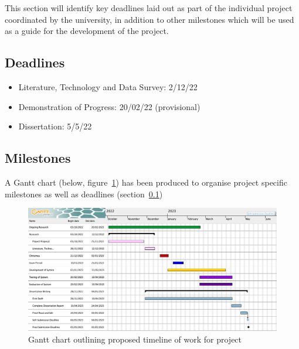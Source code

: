 This section will identify key deadlines laid out as part of the individual project coordinated by the university,
in addition to other milestones which will be used as a guide for the development of the project.

\subsection{Deadlines}\label{subsec:deadlines}
\begin{itemize}
	\item Literature, Technology and Data Survey: 2/12/22
	\item Demonstration of Progress: 20/02/22 (provisional)
	\item Dissertation: 5/5/22
\end{itemize}

\subsection{Milestones}\label{subsec:milestones}
A Gantt chart (below, figure~\ref{fig:gantt}) has been produced to organise project specific milestones as well as deadlines (section~\ref{subsec:deadlines})
\begin{figure}[h]
	\centering
	\includegraphics[width=\columnwidth]{../images/project plan}
	\caption{Gantt chart outlining proposed timeline of work for project}
	\label{fig:gantt}
\end{figure}
